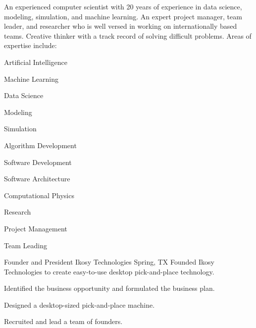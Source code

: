 \documentclass{leresume}
\begin{document}
	\thispagestyle{leempty}
	\makeresumeheaderC

	An experienced computer scientist with 20 years of experience in data science, modeling, simulation, and machine learning. An expert project manager, team leader, and researcher who is well versed in working on internationally based teams. Creative thinker with a track record of solving difficult problems. Areas of expertise include:
	\vspace{-6pt}
	\begin{multicols}{3}
		\begin{bulletedlist}
			
			\item Artificial Intelligence
			\item Machine Learning
			\item Data Science
			\item Modeling
			\item Simulation
			\item Algorithm Development
			\item Software Development
			\item Software Architecture
			\item Computational Physics
			\item Research
			\item Project Management
			\item Team Leading
		\end{bulletedlist}
		\end{multicols}

	
		
            {Founder and President}
            {Ikosy Technologies}
			{Spring, TX}
			Founded Ikosy Technologies to create easy-to-use desktop pick-and-place technology.
		\begin{bulletedlist}
			
		\item
		
				Identified the business opportunity and formulated the business plan.
			
		\item
		
				Designed a desktop-sized pick-and-place machine.
			
		\item
		
				Recruited and lead a team of founders.
			
		\end{bulletedlist}
	
\end{document}
